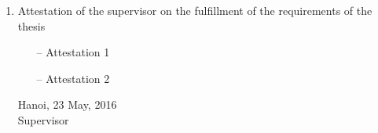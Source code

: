 \begin{requirement}
\begin{enumerate}[leftmargin=*]
	\item Attestation of the supervisor on the fulfillment of the requirements of the thesis
	\begin{itemize}
		\item[--] Attestation 1
		\item[--] Attestation 2
	\end{itemize}
	\flushright
	\begin{minipage}{0.5\linewidth}
		\centering
		Hanoi, 23 May, 2016\\
		Supervisor\\
		\vspace{30pt}
		\supervisor
	\end{minipage}	
\end{enumerate}
\end{requirement}